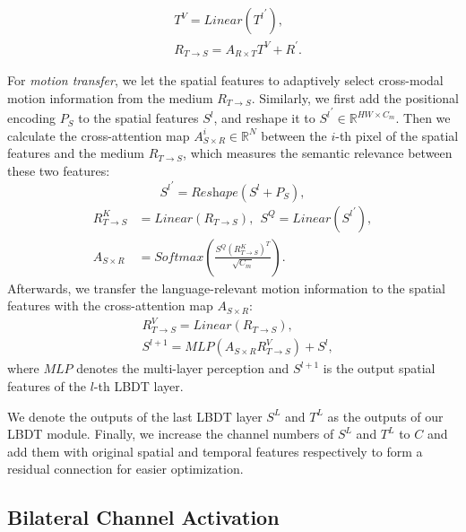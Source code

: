 \documentclass[10pt,twocolumn,letterpaper]{article}
\begin{document}
\begin{equation}
\begin{aligned}
    &T^V=\textit{Linear}({T^l}^\prime),\\
    &R_{T\rightarrow S} = A_{R\times T}T^V + R^\prime.
\end{aligned}
\end{equation}

For \textit{motion transfer}, we let the spatial features to adaptively select cross-modal motion information from the medium $R_{T\rightarrow S}$. Similarly, we first add the positional encoding $P_S$ to the spatial features $S^l$, and reshape it to ${S^l}^\prime \in \mathbb{R}^{HW\times C_m}$. Then we calculate the cross-attention map $A_{S\times R}^i \in \mathbb{R}^{N}$ between the $i$-th pixel of the spatial features and the medium $R_{T\rightarrow S}$, which measures the semantic relevance between these two features:
\begin{equation}
    {S^l}^\prime=\textit{Reshape}(S^l+P_S),
\end{equation}
\begin{equation}
\begin{aligned}
    R_{T\rightarrow S}^{K} &= \textit{Linear}(R_{T\rightarrow S}),~~S^Q = \textit{Linear}({S^l}^\prime),\\
    A_{S\times R}& = \textit{Softmax}(\frac{S^Q{(R_{T\rightarrow S}^K)}^T}{\sqrt{C_m}}).
\end{aligned}
\end{equation}
Afterwards, we transfer the language-relevant motion information to the spatial features with the cross-attention map $A_{S\times R}$:
\begin{equation}
\begin{aligned}
    &R_{T\rightarrow S}^{V} = \textit{Linear}(R_{T\rightarrow S}),\\
    &S^{l+1} = \textit{MLP}(A_{S\times R}R_{T\rightarrow S}^V) + S^l,
\end{aligned}
\end{equation}
where $\textit{MLP}$ denotes the multi-layer perception and $S^{l+1}$ is the output spatial features of the $l$-th LBDT layer.

We denote the outputs of the last LBDT layer $S^L$ and $T^L$ as the outputs of our LBDT module. Finally, we increase the channel numbers of $S^L$ and $T^L$ to $C$ and add them with original spatial and temporal features respectively to form a residual connection for easier optimization.

\subsection{Bilateral Channel Activation}
\label{sec:method:tfm}
\end{document}
